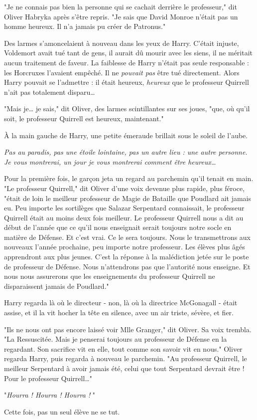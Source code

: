 "Je ne connais pas bien la personne qui se cachait derrière le professeur," dit Oliver Habryka après s'être repris. "Je sais que David Monroe n'était pas un homme heureux. Il n'a jamais pu créer de Patronus."

Des larmes s'amoncelaient à nouveau dans les yeux de Harry. C'était injuste, Voldemort avait tué tant de gens, il aurait dû mourir avec les siens, il ne méritait aucun traitement de faveur. La faiblesse de Harry n'était pas seule responsable : les Horcruxes l'avaient empêché. Il ne \emph{pouvait pas}  être tué directement. Alors Harry pouvait se l'admettre : il était heureux, \emph{heureux}  que le professeur Quirrell n'ait pas totalement disparu…

"Mais je… je sais," dit Oliver, des larmes scintillantes sur ses joues, "que, où qu'il soit, le professeur Quirrell est heureux, maintenant."

À la main gauche de Harry, une petite émeraude brillait sous le soleil de l'aube.

\emph{Pas au paradis, pas une étoile lointaine, pas un autre lieu : une autre personne. Je vous montrerai, un jour je vous montrerai comment être heureux…} 

Pour la première fois, le garçon jeta un regard au parchemin qu'il tenait en main. "Le professeur Quirrell," dit Oliver d'une voix devenue plus rapide, plus féroce, "était de loin le meilleur professeur de Magie de Bataille que Poudlard ait jamais eu. Peu importe les sortilèges que Salazar Serpentard connaissait, le professeur Quirrell était au moins deux fois meilleur. Le professeur Quirrell nous a dit au début de l'année que ce qu'il nous enseignait serait toujours notre socle en matière de Défense. Et c'est vrai. Ce le sera toujours. Nous le transmettrons aux nouveaux l'année prochaine, peu importe notre professeur. Les élèves plus âgés apprendront aux plus jeunes. C'est la réponse à la malédiction jetée sur le poste de professeur de Défense. Nous n'attendrons pas que l'autorité nous enseigne. Et nous nous assurerons que les enseignements du professeur Quirrell ne disparaissent jamais de Poudlard."

Harry regarda là où le directeur - non, là où la directrice McGonagall - était assise, et il la vit hocher la tête en silence, avec un air triste, sévère, et fier.

"Ils ne nous ont pas encore laissé voir Mlle Granger," dit Oliver. Sa voix trembla. "La Ressuscitée. Mais je penserai toujours au professeur de Défense en la regardant. Son sacrifice vit en elle, tout comme son savoir vit en nous." Oliver regarda Harry, puis regarda à nouveau le parchemin. "Au professeur Quirrell, le meilleur Serpentard à avoir jamais été, celui que tout Serpentard devrait être ! Pour le professeur Quirrell…"

"\emph{Hourra ! Hourra ! Hourra !} "

Cette fois, pas un seul élève ne se tut.

